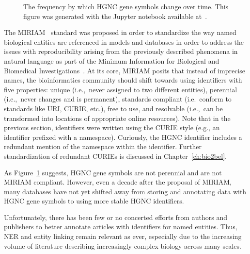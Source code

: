 \begin{figure}
    \captionsetup{format=plain}
    \caption[HGNC Gene Symbol Half Lives]{The frequency by which \ac{HGNC} gene symbols change over time. This figure was generated with the Jupyter notebook available at~\cite{Hoyt2018GeneHalfLife}.}
    \label{fig:gene_symbol_half_life}
\end{figure}

The \ac{MIRIAM}~\cite{Laibe2007} standard was proposed in order to standardize the way named biological entities are referenced in models and databases in order to address the issues with reproducibility arising from the previously described phenomena in natural language as part of the Minimum Information for Biological and Biomedical Investigations~\cite{Taylor2008}.
At its core, \ac{MIRIAM} posits that instead of imprecise names, the bioinformatics community should shift towards using identifiers with five properties: unique (i.e.,\ never assigned to two different entities), perennial (i.e.,\ never changes and is permanent), standards compliant (i.e.\ conform to standards like \ac{URI}, \ac{CURIE}, etc.), free to use, and resolvable (i.e.,\ can be transformed into locations of appropriate online resources).
Note that in the previous section, identifiers were written using the \ac{CURIE} style (e.g., an identifier prefixed with a namespace).
Curiously, the \ac{HGNC} identifier includes a redundant mention of the namespace within the identifier.
Further standardization of redundant \ac{CURIE}s is discussed in Chapter~\ref{ch:bio2bel}.

As Figure~\ref{fig:gene_symbol_half_life} suggests, \ac{HGNC} gene symbols are not perennial and are not \ac{MIRIAM} compliant.
However, even a decade after the proposal of \ac{MIRIAM}, many databases have not yet shifted away from storing and annotating data with \ac{HGNC} gene symbols to using more stable \ac{HGNC} identifiers.

Unfortunately, there has been few or no concerted efforts from authors and publishers to better annotate articles with identifiers for named entities.
Thus, \ac{NER} and entity linking remain relevant as ever, especially due to the increasing volume of literature describing increasingly complex biology across many scales.
